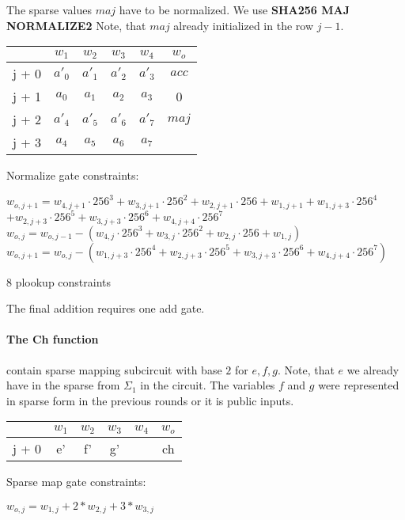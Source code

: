 The sparse values $maj$ have to be normalized.
We use \textbf{SHA256 MAJ NORMALIZE2}
Note, that $maj$ already initialized in the row $j - 1$.
\begin{center}
\begin{tabular}{ c|c|c|c|c|c} 
  & $w_1$ & $w_2$ & $w_3$ & $w_4$ & $w_o$\\ 
 \hline
j + 0 & $a'_0$ & $a'_1$ & $a'_2$ & $a'_3$ &  $acc$\\ 
j + 1 & $a_0$ & $ a_1$ & $a_2$ & $a_3$ & 0\\
j + 2 & $a'_4$ & $a'_5$ & $a'_6$ & $a'_7$ & $maj$ \\ 
j + 3 & $a_4$ & $ a_5$ & $a_6$ & $a_7$ &  \\
\end{tabular}
\end{center}

Normalize gate constraints:
\begin{center}
$w_{o,j+1} = w_{4,j+1} \cdot 256^3 + w_{3,j+1} \cdot 256^2 + w_{2,j+1} \cdot 256 + w_{1,j+1}
	+  w_{1,j+3} \cdot 256^4$ \\ 
	$+ w_{2,j+3} \cdot 256^5+ w_{3,j+3} \cdot 256^6 + w_{4,j+4} \cdot 256^7$ \\
$w_{o,j} = w_{o, j - 1} - (w_{4,j} \cdot 256^3 + w_{3,j} \cdot 256^2 + w_{2,j} \cdot 256 + w_{1,j})$ \\
$w_{o,j+1} = w_{o,j} - ( w_{1,j+3} \cdot 256^4 + w_{2,j+3} \cdot 256^5+ w_{3,j+3} \cdot 256^6 + w_{4,j+4} \cdot 256^7)$

8 plookup constraints \\
\end{center}


The final addition requires one add gate.

\paragraph{The Ch function}
contain sparse mapping subcircuit with base $2$ for $e, f ,g$.
Note, that $e$ we already have in the sparse from $\Sigma_1$ in the circuit. 
The variables $f$ and $g$ were represented in sparse form in the previous rounds or it is public inputs.
\begin{center}
\begin{tabular}{ c|c|c|c|c|c } 
  & $w_1$ & $w_2$ & $w_3$ & $w_4$ & $w_o$\\ 
 \hline 
j + 0 & e' & f' & g' & & ch\\
\end{tabular}
\end{center}
Sparse map gate constraints:
\begin{center}
$w_{o, j} = w_{1,j} + 2*w_{2, j} + 3*w_{3, j}$ \\
\end{center}

